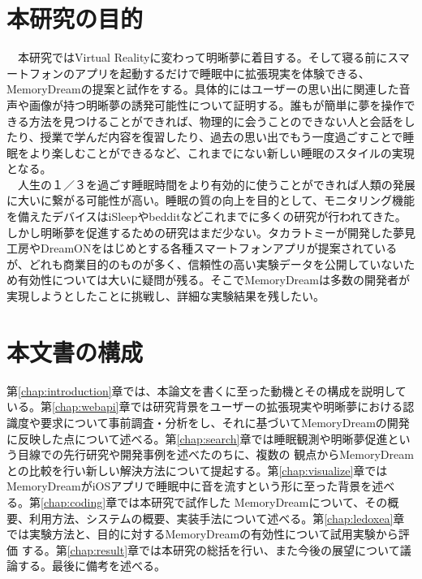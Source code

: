 \section{本研究の目的}
　本研究ではVirtual Realityに変わって明晰夢に着目する。そして寝る前にスマートフォンのアプリを起動するだけで睡眠中に拡張現実を体験できる、MemoryDreamの提案と試作をする。具体的にはユーザーの思い出に関連した音声や画像が持つ明晰夢の誘発可能性について証明する。誰もが簡単に夢を操作できる方法を見つけることができれば、物理的に会うことのできない人と会話をしたり、授業で学んだ内容を復習したり、過去の思い出でもう一度過ごすことで睡眠をより楽しむことができるなど、これまでにない新しい睡眠のスタイルの実現となる。\\
　人生の１／３を過ごす睡眠時間をより有効的に使うことができれば人類の発展に大いに繋がる可能性が高い。睡眠の質の向上を目的として、モニタリング機能を備えたデバイスはiSleep\cite{iSleep}やbeddit\cite{beddit}などこれまでに多くの研究が行われてきた。しかし明晰夢を促進するための研究はまだ少ない。タカラトミーが開発した夢見工房\cite{takaratomi}やDreamON\cite{dreamOn}をはじめとする各種スマートフォンアプリが提案されているが、どれも商業目的のものが多く、信頼性の高い実験データを公開していないため有効性については大いに疑問が残る。そこでMemoryDreamは多数の開発者が実現しようとしたことに挑戦し、詳細な実験結果を残したい。

\section{本文書の構成}
第\ref{chap:introduction}章では、本論文を書くに至った動機とその構成を説明している。第\ref{chap:webapi}章では研究背景をユーザーの拡張現実や明晰夢における認識度や要求について事前調査・分析をし、それに基づいてMemoryDreamの開発に反映した点について述べる。第\ref{chap:search}章では睡眠観測や明晰夢促進という目線での先行研究や開発事例を述べたのちに、複数の 観点からMemoryDreamとの比較を行い新しい解決方法について提起する。第\ref{chap:visualize}章ではMemoryDreamがiOSアプリで睡眠中に音を流すという形に至った背景を述べる。第\ref{chap:coding}章では本研究で試作した MemoryDreamについて、その概要、利用方法、システムの概要、実装手法について述べる。第\ref{chap:ledoxea}章では実験方法と、目的に対するMemoryDreamの有効性について試用実験から評価 する。第\ref{chap:result}章では本研究の総括を行い、また今後の展望について議論する。最後に備考を述べる。
